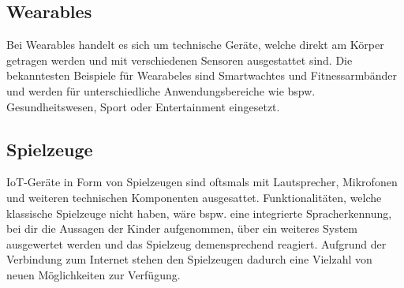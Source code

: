 \subsection{Wearables}
Bei Wearables handelt es sich um technische Geräte, welche direkt am Körper getragen werden und mit verschiedenen 
Sensoren ausgestattet sind. Die bekanntesten Beispiele für Wearabeles sind Smartwachtes und Fitnessarmbänder und 
werden für unterschiedliche Anwendungsbereiche wie bspw. Gesundheitswesen, Sport oder Entertainment eingesetzt.


\subsection{Spielzeuge}
IoT-Geräte in Form von Spielzeugen sind oftsmals mit Lautsprecher, Mikrofonen und weiteren technischen Komponenten ausgesattet.
Funktionalitäten, welche klassische Spielzeuge nicht haben, wäre bspw. eine integrierte
Spracherkennung, bei dir die Aussagen der Kinder aufgenommen, über ein weiteres System ausgewertet werden und das Spielzeug
demensprechend reagiert. Aufgrund der Verbindung zum Internet stehen den Spielzeugen dadurch eine Vielzahl von neuen Möglichkeiten
zur Verfügung.
